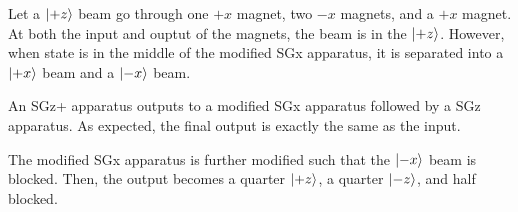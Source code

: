\begin{aside}
	Let a \(\lvert+z\rangle\) beam go through one \(+x\) magnet, two \(-x\) magnets, and a \(+x\) magnet. At both the input and ouptut of the magnets, the beam is in the \(\lvert+z\rangle\). However, when state is in the middle of the modified SGx apparatus, it is separated into a \(\lvert+x\rangle\) beam and a \(\lvert-x\rangle\) beam. 

	An SGz+ apparatus outputs to a modified SGx apparatus followed by a SGz apparatus. As expected, the final output is exactly the same as the input. 
	
	The modified SGx apparatus is further modified such that the \(\lvert-x\rangle\) beam is blocked. Then, the output becomes a quarter \(\lvert+z\rangle\), a quarter \(\lvert-z\rangle\), and half blocked.
\end{aside}

